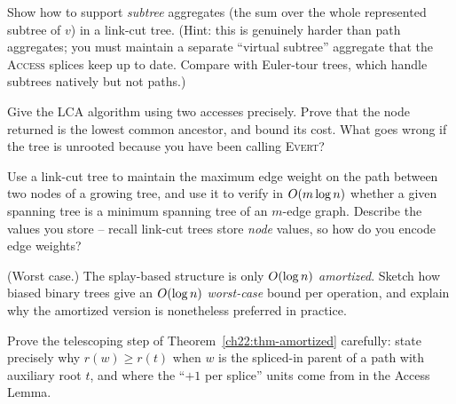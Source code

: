 \begin{exercise}
Show how to support \emph{subtree} aggregates (the sum over the whole represented
subtree of $v$) in a link-cut tree. (Hint: this is genuinely harder than path
aggregates; you must maintain a separate ``virtual subtree'' aggregate that the
\textsc{Access} splices keep up to date. Compare with Euler-tour trees, which
handle subtrees natively but not paths.)
\end{exercise}

\begin{exercise}
Give the LCA algorithm using two accesses precisely. Prove that the node returned
is the lowest common ancestor, and bound its cost. What goes wrong if the tree is
unrooted because you have been calling \textsc{Evert}?
\end{exercise}

\begin{exercise}
Use a link-cut tree to maintain the maximum edge weight on the path between two
nodes of a growing tree, and use it to verify in $O(m\log n)$ whether a given
spanning tree is a minimum spanning tree of an $m$-edge graph. Describe the values
you store -- recall link-cut trees store \emph{node} values, so how do you encode
edge weights?
\end{exercise}

\begin{exercise}
(Worst case.) The splay-based structure is only $O(\log n)$ \emph{amortized}.
Sketch how biased binary trees give an $O(\log n)$ \emph{worst-case} bound per
operation, and explain why the amortized version is nonetheless preferred in
practice.
\end{exercise}

\begin{exercise}
Prove the telescoping step of Theorem~\ref{ch22:thm-amortized} carefully: state
precisely why $r(w)\ge r(t)$ when $w$ is the spliced-in parent of a path with
auxiliary root $t$, and where the ``$+1$ per splice'' units come from in the
Access Lemma.
\end{exercise}
